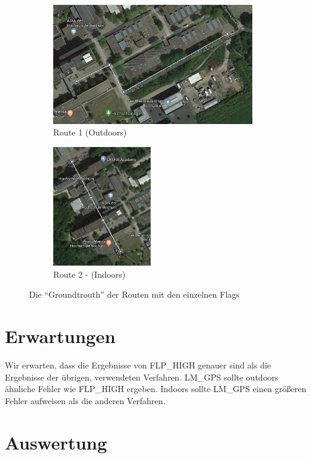 \begin{figure}[h!]
	\centering
	\begin{subfigure}[b]{.64\textwidth}
		\centering
        \includegraphics[height=5.2cm]{route1}
        \caption{Route  1 (Outdoors)}
        \label{fig:route1}
    \end{subfigure}
    \begin{subfigure}[b]{.35\textwidth}
    	\centering
        \includegraphics[height=5.2cm]{route2}
        \caption{Route 2 - (Indoors)}
        \label{fig:route2}
    \end{subfigure}
    \caption{Die "`Groundtrouth"' der Routen mit den einzelnen Flags}
    \label{fig:routen}
\end{figure}

\section{Erwartungen}

Wir erwarten, dass die Ergebnisse von FLP\_HIGH genauer sind als die Ergebnisse der übrigen, verwendeten Verfahren. LM\_GPS sollte outdoors ähnliche Fehler wie FLP\_HIGH ergeben. Indoors sollte LM\_GPS einen größeren Fehler aufweisen als die anderen Verfahren.

	
\section{Auswertung}	

